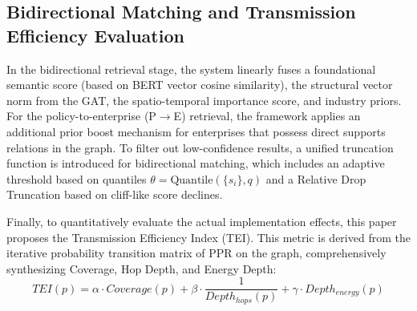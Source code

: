 \subsection{Bidirectional Matching and Transmission Efficiency Evaluation}
In the bidirectional retrieval stage, the system linearly fuses a foundational semantic score (based on BERT vector cosine similarity), the structural vector norm from the GAT, the spatio-temporal importance score, and industry priors. For the policy-to-enterprise (P$\rightarrow$E) retrieval, the framework applies an additional prior boost mechanism for enterprises that possess direct supports relations in the graph. To filter out low-confidence results, a unified truncation function is introduced for bidirectional matching, which includes an adaptive threshold based on quantiles $\theta = \mathrm{Quantile}(\{s_i\}, q)$ and a Relative Drop Truncation based on cliff-like score declines.

Finally, to quantitatively evaluate the actual implementation effects, this paper proposes the Transmission Efficiency Index (TEI). This metric is derived from the iterative probability transition matrix of PPR on the graph, comprehensively synthesizing Coverage, Hop Depth, and Energy Depth:
$$ TEI(p)=\alpha \cdot Coverage(p) + \beta\cdot \frac{1}{Depth_{hops}(p)} + \gamma\cdot Depth_{energy}(p) $$
